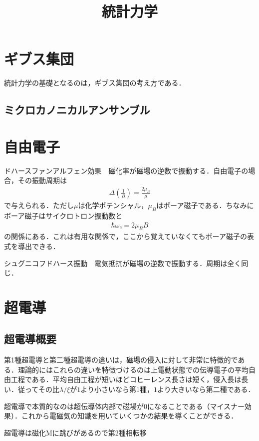 \documentclass[a4j]{jarticle}
\title{統計力学}
\begin{document}
\maketitle

\section{ギブス集団}
統計力学の基礎となるのは，ギブス集団の考え方である．
\subsection{ミクロカノニカルアンサンブル}


\section{自由電子}

ドハースファンアルフェン効果　磁化率が磁場の逆数で振動する．自由電子の場合，その振動周期は
\begin{align*}
 \Delta \left(\frac{1}{B}\right)=\frac{2\mu_B}{\mu}
\end{align*}
で与えられる．ただし$\mu$は化学ポテンシャル，$\mu_B$はボーア磁子である．ちなみにボーア磁子はサイクロトロン振動数と
\begin{align*}
 \hbar \omega_c=2\mu_BB
\end{align*}
の関係にある．これは有用な関係で，ここから覚えていなくてもボーア磁子の表式を導出できる．


シュグニコフドハース振動　電気抵抗が磁場の逆数で振動する．周期は全く同じ．

\section{超電導}
\subsection{超電導概要}
第1種超電導と第二種超電導の違いは，磁場の侵入に対して非常に特徴的である．理論的にはこれらの違いを特徴づけるのは上電動状態での伝導電子の平均自由工程である．平均自由工程が短いほどコヒーレンス長さは短く，侵入長は長い．従ってその比$\lambda /\xi$が$1$より小さいなら第1種，$1$より大きいなら第二種である．



超電導で本質的なのは超伝導体内部で磁場が$0$になることである（マイスナー効果）．これから電磁気の知識を用いていくつかの結果を導くことができる．

超電導は磁化Mに跳びがあるので第2種相転移
\end{document}
